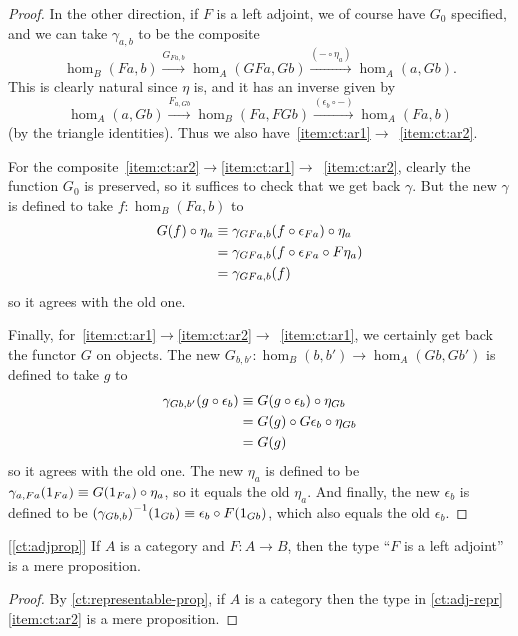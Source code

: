 \begin{proof}
  In the other direction, if $F$ is a left adjoint, we of course have $G_0$ specified, and we can take $\gamma_{a,b}$ to be the composite
  \[ \hom_B(Fa,b)
  \xrightarrow{G_{Fa,b}} \hom_A(GFa,Gb)
  \xrightarrow{(-\circ \eta_a)} \hom_A(a,Gb).
  \]
  This is clearly natural since $\eta$ is, and it has an inverse given by
  \[ \hom_A(a,Gb)
  \xrightarrow{F_{a,Gb}} \hom_B(Fa,FGb)
  \xrightarrow{(\epsilon_b \circ -)} \hom_A(Fa,b)
  \]
  (by the triangle identities).
  Thus we also have~\ref{item:ct:ar1}$\to$~\ref{item:ct:ar2}.

  For the composite~\ref{item:ct:ar2}$\to$\ref{item:ct:ar1}$\to$~\ref{item:ct:ar2}, clearly the function $G_0$ is preserved, so it suffices to check that we get back $\gamma$.
  But the new $\gamma$ is defined to take $f:\hom_B(Fa,b)$ to
  \begin{align*}
    G(f) \circ \eta_a
    &\equiv \gamma_{G Fa, b}(f \circ \epsilon_{Fa}) \circ \eta_a\\
    &= \gamma_{G Fa, b}(f \circ \epsilon_{Fa} \circ F\eta_a)\\
    &= \gamma_{G Fa, b}(f)
  \end{align*}
  so it agrees with the old one.

  Finally, for~\ref{item:ct:ar1}$\to$\ref{item:ct:ar2}$\to$~\ref{item:ct:ar1}, we certainly get back the functor $G$ on objects.
  The new $G_{b,b'}:\hom_B(b,b') \to \hom_A(Gb,Gb')$ is defined to take $g$ to
  \begin{align*}
    \gamma_{G b, b'}(g \circ \epsilon_b)
    &\equiv G(g \circ \epsilon_b) \circ \eta_{Gb}\\
    &= G(g) \circ G\epsilon_b \circ \eta_{Gb}\\
    &= G(g)
  \end{align*}
  so it agrees with the old one.
  The new $\eta_a$ is defined to be $\gamma_{a,Fa}(1_{Fa}) \equiv G(1_{Fa}) \circ \eta_a$, so it equals the old $\eta_a$.
  And finally, the new $\epsilon_b$ is defined to be ${(\gamma_{Gb,b})}^{-1}(1_{Gb}) \equiv \epsilon_b \circ F(1_{Gb})$, which also equals the old $\epsilon_b$.
\end{proof}

\begin{cor}\label{ct:adjprop2}[\autoref{ct:adjprop}]
  If $A$ is a category and $F:A\to B$, then the type ``$F$ is a left adjoint'' is a mere proposition.
\end{cor}
\begin{proof}
  By \autoref{ct:representable-prop}, if $A$ is a category then the type in \autoref{ct:adj-repr}\ref{item:ct:ar2} is a mere proposition.
\end{proof}


